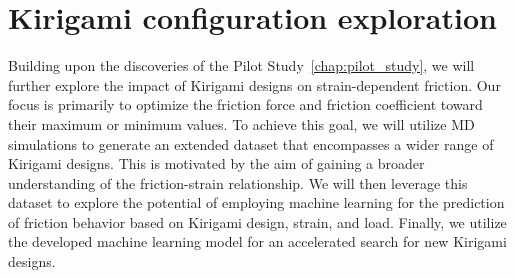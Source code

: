 \chapter{Kirigami configuration exploration}\label{chap:dataset_study}
Building upon the discoveries of the Pilot Study~\cref{chap:pilot_study}, we
will further explore the impact of Kirigami designs on strain-dependent
friction. Our focus is primarily to optimize the friction force and friction
coefficient toward their maximum or minimum values. To achieve this goal, we
will utilize \acrshort{MD} simulations to generate an extended dataset that
encompasses a wider range of Kirigami designs. This is motivated by the aim of
gaining a broader understanding of the friction-strain relationship. We will then leverage this dataset to explore the potential of employing machine
learning for the prediction of friction behavior based on Kirigami design,
strain, and load. Finally, we utilize the developed machine learning model for an
accelerated search for new Kirigami designs. 


